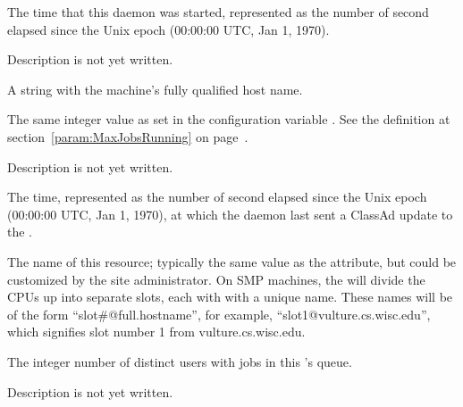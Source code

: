 \begin{description}

\item[\AdAttr{DaemonStartTime}:] The time that this daemon was
  started, represented as the number of second elapsed since
    the Unix epoch (00:00:00 UTC, Jan 1, 1970).

\item[\AdAttr{JobQueueBirthdate}:] Description is not yet written.

\item[\AdAttr{Machine}:] A string with the machine's fully qualified 
  host name.

\item[\AdAttr{MaxJobsRunning}:] The same integer value as set in the
  configuration variable .
  See the definition at section~\ref{param:MaxJobsRunning} on
  page~\pageref{param:MaxJobsRunning}.

\item[\AdAttr{MyAddress}:] Description is not yet written.

\item[\AdAttr{MyCurrentTime}:]  The time, represented as the number of 
  second elapsed since the Unix epoch (00:00:00 UTC, Jan 1, 1970),
  at which the  daemon last sent a ClassAd update to the
  .

\item[\AdAttr{Name}:] The name of this resource; typically the same value as
  the  attribute, but could be customized by the site
  administrator.
  On SMP machines, the  will divide the CPUs up into separate
  slots, each with with a unique name.
  These names will be of the form ``slot\#@full.hostname'', for example,
  ``slot1@vulture.cs.wisc.edu'', which signifies slot number 1 from
  vulture.cs.wisc.edu.

\item[\AdAttr{NumUsers}:] The integer number of distinct users with jobs in
  this 's queue.

\item[\AdAttr{PublicNetworkIpAddr}:] Description is not yet written.


\end{description}
